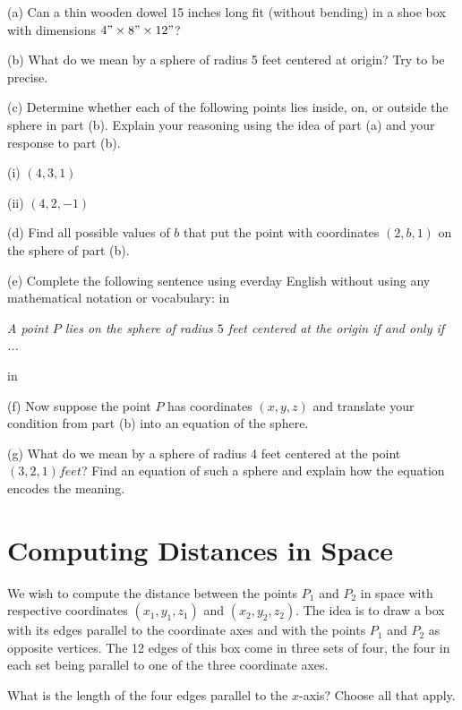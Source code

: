 \documentclass{ximera}
\newcommand{\pskip}{\vskip 0.1 in}
\begin{document}
\begin{question}   \label{QLMn4947332}
\begin{freeResponse}
(a) Can a thin wooden dowel 15 inches long fit (without bending) in a shoe box with dimensions $4"\times 8"\times 12"$?

(b) What do we mean by a sphere of radius 5 feet centered at origin? Try to be precise.

(c) Determine whether each of the following points lies inside, on, or outside the sphere in part (b). Explain your reasoning using the idea of part (a) and your response to part (b).

(i) $(4,3,1)$

(ii) $(4,2,-1)$


(d) Find all possible values of $b$ that put the point with coordinates $(2,b,1)$ on the sphere of part (b).

(e) Complete the following sentence using everday English without using any mathematical notation or vocabulary:
\pskip

\emph{A point $P$ lies on the sphere of radius $5$ feet centered at the origin if and only if ...}

\pskip

(f)  Now suppose the point $P$ has coordinates $(x,y,z)$ and translate your condition from part (b) into an equation of the sphere.
 
(g) What do we mean by a sphere of radius 4 feet centered at the point $(3,2,1) feet$? Find an equation of such a sphere and explain how the equation encodes the meaning.

\end{freeResponse}

\end{question}


\section*{Computing Distances in Space}
We wish to compute the distance between the points $P_1$ and $P_2$ in space with respective coordinates $(x_1, y_1, z_1)$ and $(x_2, y_2, z_2)$. The idea is to draw a box with its edges parallel to the coordinate axes and with the points $P_1$ and $P_2$ as opposite vertices. The 12 edges of this box come in three sets of four, the four in each set being parallel to one of the three coordinate axes. 

\begin{question} \label{Q324tgtgt}
What is the length of the four edges parallel to the $x$-axis? Choose all that apply. 
\begin{selectAll}
\end{selectAll}
\end{question}
\end{document}
